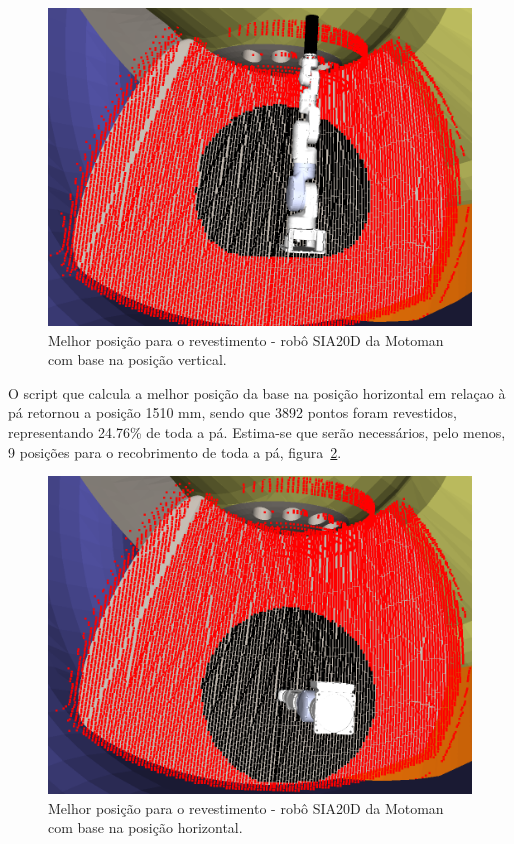 \begin{figure}[h!]	
	\includegraphics[width=\columnwidth]{figs/bighatch/sia20d_bestposv.png}
	\caption{Melhor posição para o revestimento - robô SIA20D da Motoman com base
	na posição vertical.}
	\label{fig::sia20dbestposv}
\end{figure}

O script que calcula a melhor posição da base na posição horizontal em relaçao à
pá retornou a posição 1510 mm, sendo que 3892 pontos foram revestidos,
representando 24.76\% de toda a pá. Estima-se que serão necessários, pelo menos,
9 posições para o recobrimento de toda a pá, figura~\ref{fig::sia20dbestposh}.

\begin{figure}[h!]	
	\includegraphics[width=\columnwidth]{figs/bighatch/sia20d_bestposh.png}
	\caption{Melhor posição para o revestimento - robô SIA20D da Motoman com base
	na posição horizontal.}
	\label{fig::sia20dbestposh}
\end{figure}

